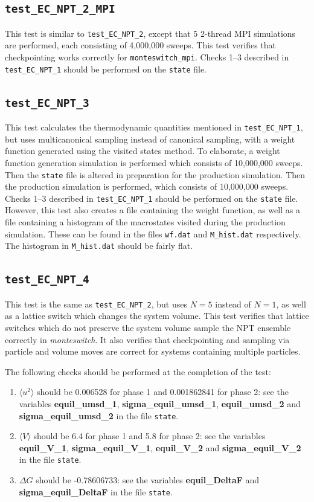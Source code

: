 \documentclass{report}
\begin{document}
\subsection{\texttt{test\_EC\_NPT\_2\_MPI}}
This test is similar to \texttt{test\_EC\_NPT\_2}, except that 5 2-thread MPI simulations are performed, each consisting of
4,000,000 sweeps. This test verifies that checkpointing works correctly for \texttt{monteswitch\_mpi}. 
Checks 1--3 described in \texttt{test\_EC\_NPT\_1} should be performed on the \texttt{state} file.


\subsection{\texttt{test\_EC\_NPT\_3}}
This test calculates the thermodynamic quantities mentioned in \texttt{test\_EC\_NPT\_1}, but uses multicanonical sampling
instead of canonical sampling, with a weight function generated using the visited states method. To elaborate, a weight function generation 
simulation is performed which consists of 10,000,000 sweeps. Then the \texttt{state} file is altered in preparation 
for the production simulation. Then the production simulation is performed, which consists of 10,000,000 sweeps.
Checks 1--3 described in \texttt{test\_EC\_NPT\_1} should be performed on the \texttt{state} file. However, this test
also creates a file containing the weight function, as well as a file containing a histogram of 
the macrostates visited during the production simulation. These can be found in the files \texttt{wf.dat} and \texttt{M\_hist.dat}
respectively. The histogram in \texttt{M\_hist.dat} should be fairly flat.


\subsection{\texttt{test\_EC\_NPT\_4}}
This test is the same as \texttt{test\_EC\_NPT\_2}, but uses $N=5$ instead of $N=1$, as well as a lattice switch which changes the system volume.
This test verifies that lattice switches which do not preserve the system volume sample the NPT ensemble correctly in \emph{monteswitch}. It also 
verifies that checkpointing and sampling via particle and volume moves are correct for systems containing multiple particles.

The following checks should be performed at the completion of the test:
\begin{enumerate}
\item
$\langle u^2\rangle$ should be 0.006528 for phase 1 and 0.001862841 for phase 2: see the 
variables \textbf{equil\_umsd\_1}, \textbf{sigma\_equil\_umsd\_1}, \textbf{equil\_umsd\_2} and \textbf{sigma\_equil\_umsd\_2} 
in the file \texttt{state}.
\item
$\langle V\rangle$ should be 6.4 for phase 1 and 5.8 for phase 2: see the variables \textbf{equil\_V\_1}, 
\textbf{sigma\_equil\_V\_1}, \textbf{equil\_V\_2} and \textbf{sigma\_equil\_V\_2} in the file \texttt{state}.
\item
$\Delta G$ should be -0.78606733: see the variables \textbf{equil\_DeltaF} and \textbf{sigma\_equil\_DeltaF} in the file \texttt{state}.
\end{enumerate}
\end{document}

